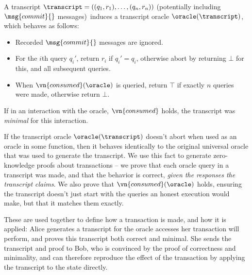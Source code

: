 \begin{definition}
  A transcript $\transcript = ((q_1, r_1), \ldots, (q_n, r_n))$
  (potentially including $\msg{commit}{}$ messages)\ induces a
  transcript oracle $\oracle(\transcript)$, which behaves as follows:
  \begin{itemize}
    \item Recorded $\msg{commit}{}$ messages are ignored.
    \item For the $i$th query $q_i'$, return $r_i$ if $q_i' = q_i$, otherwise
      abort by returning $\bot$ for this, and all subsequent queries.
    \item When $\vn{consumed}(\oracle)$ is queried, return $\top$ if exactly $n$
      queries were made, otherwise return $\bot$.
  \end{itemize}
  If in an interaction with the oracle, $\vn{consumed}$ holds, the transcript
  was \emph{minimal} for this interaction.
\end{definition}

If the transcript oracle $\oracle(\transcript)$ doesn't abort when used as an
oracle in some function, then it behaves identically to the original universal
oracle that was used to generate the transcript. We use this fact to generate
zero-knowledge proofs about transactions -- we prove that each oracle query in a
transcript was made, and that the behavior is correct, \emph{given the
  responses the transcript claims}. We also prove that $\vn{consumed}(\oracle)$
holds, ensuring the transcript doesn't just start with the queries an honest
execution would make, but that it matches them exactly.

These are used together to define how a transaction is made, and how it is
applied: Alice generates a transcript for the oracle accesses her transaction
will perform, and proves this transcript both correct and minimal. She sends the
transcript and proof to Bob, who is convinced by the proof of correctness and
minimality, and can therefore reproduce the effect of the transaction by
applying the transcript to the state directly.

